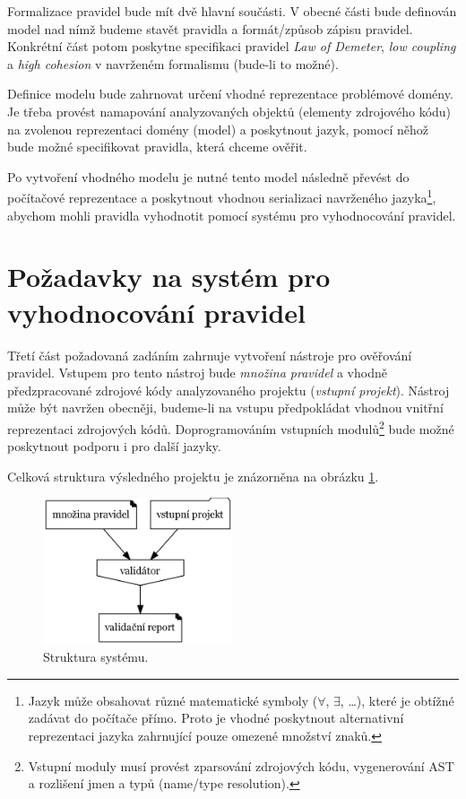 Formalizace pravidel bude mít dvě hlavní součásti. V obecné části bude definován model nad nímž budeme stavět pravidla a formát/způsob zápisu pravidel. Konkrétní část potom poskytne specifikaci pravidel \emph{Law of Demeter}, \emph{low coupling} a \emph{high cohesion} v navrženém formalismu (bude-li to možné).

Definice modelu bude zahrnovat určení vhodné reprezentace problémové domény. Je třeba provést namapování analyzovaných objektů (elementy zdrojového kódu) na zvolenou reprezentaci domény (model) a poskytnout jazyk, pomocí něhož bude možné specifikovat pravidla, která chceme ověřit.

Po vytvoření vhodného modelu je nutné tento model následně převést do počítačové reprezentace a poskytnout vhodnou serializaci navrženého jazyka\footnote{Jazyk může obsahovat různé matematické symboly ($\forall$, $\exists$, \ldots), které je obtížné zadávat do počítače přímo. Proto je vhodné poskytnout alternativní reprezentaci jazyka zahrnující pouze omezené množství znaků.}, abychom mohli pravidla vyhodnotit pomocí systému pro vyhodnocování pravidel.

\section{Požadavky na systém pro vyhodnocování pravidel}
\label{requirements-rules_evaluation}
Třetí část požadovaná zadáním zahrnuje vytvoření nástroje pro ověřování pravidel. Vstupem pro tento nástroj bude \emph{množina pravidel} a vhodně předzpracované zdrojové kódy analyzovaného projektu (\emph{vstupní projekt}). Nástroj může být navržen obecněji, budeme-li na vstupu předpokládat vhodnou vnitřní reprezentaci zdrojových kódů. Doprogramováním vstupních modulů\footnote{Vstupní moduly musí provést zparsování zdrojových kódu, vygenerování AST a rozlišení jmen a typů (name/type resolution).} bude možné poskytnout podporu i pro další jazyky.

Celková struktura výsledného projektu je znázorněna na obrázku \ref{requirements-system_structure}.

\begin{figure}[h!]
  \centering
  \includegraphics[width=0.5\textwidth]{./graphs/global_structure.png}
  \caption{Struktura systému.\label{requirements-system_structure}}
\end{figure}

